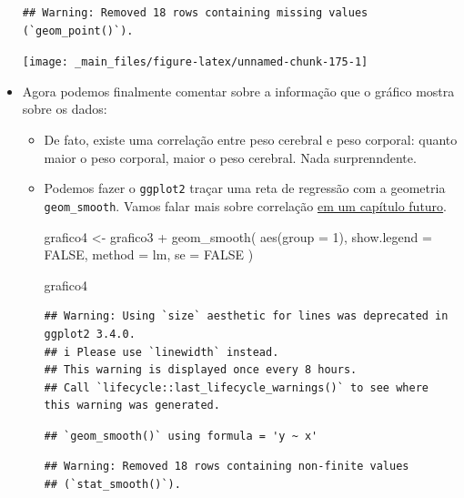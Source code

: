 \documentclass[
  11pt]{report}
\newenvironment{Shaded}{\begin{snugshade}}{\end{snugshade}}
\newcommand{\AttributeTok}[1]{\textcolor[rgb]{0.77,0.63,0.00}{#1}}
\newcommand{\ConstantTok}[1]{\textcolor[rgb]{0.00,0.00,0.00}{#1}}
\newcommand{\DecValTok}[1]{\textcolor[rgb]{0.00,0.00,0.81}{#1}}
\newcommand{\FunctionTok}[1]{\textcolor[rgb]{0.00,0.00,0.00}{#1}}
\newcommand{\NormalTok}[1]{#1}
\newcommand{\OtherTok}[1]{\textcolor[rgb]{0.56,0.35,0.01}{#1}}
\newcommand{\SpecialCharTok}[1]{\textcolor[rgb]{0.00,0.00,0.00}{#1}}
\newcommand{\StringTok}[1]{\textcolor[rgb]{0.31,0.60,0.02}{#1}}
\renewenvironment{Shaded}{
    \begin{mdframed}[%
      roundcorner=2pt,%
      innerleftmargin=5pt,%
      innerrightmargin=5pt,%
      topline=true,%
      leftline=true,%
      rightline=true,%
      bottomline=true,%
      linewidth=0.5pt,%
      linecolor=black!20,%
      backgroundcolor=black!2,%
      skipabove=2ex,%
      skipbelow=2.5ex%
    ]%
  }
  {
    \end{mdframed}
  }
\begin{document}
\begin{itemize}
\begin{verbatim}
## Warning: Removed 18 rows containing missing values (`geom_point()`).
\end{verbatim}

  \begin{center}\texttt{[image: \_main\_files/figure-latex/unnamed-chunk-175-1]} \end{center}
\item
  Agora podemos finalmente comentar sobre a informação que o gráfico mostra sobre os dados:

  \begin{itemize}
  \item
    De fato, existe uma correlação entre peso cerebral e peso corporal: quanto maior o peso corporal, maior o peso cerebral. Nada surprenndente.
  \item
    \protect\hypertarget{grafico4}{}{} Podemos fazer o \texttt{ggplot2} traçar uma reta de regressão com a geometria \texttt{geom\_smooth}. Vamos falar mais sobre correlação \protect\hyperlink{correlacao}{em um capítulo futuro}.

\begin{Shaded}
\begin{Highlighting}[]
\NormalTok{grafico4 }\OtherTok{\textless{}{-}}\NormalTok{ grafico3 }\SpecialCharTok{+}
  \FunctionTok{geom\_smooth}\NormalTok{(}
    \FunctionTok{aes}\NormalTok{(}\AttributeTok{group =} \DecValTok{1}\NormalTok{), }
    \AttributeTok{show.legend =} \ConstantTok{FALSE}\NormalTok{,}
    \AttributeTok{method =} \StringTok{\textquotesingle{}lm\textquotesingle{}}\NormalTok{, }
    \AttributeTok{se =} \ConstantTok{FALSE}
\NormalTok{  )}

\NormalTok{grafico4}
\end{Highlighting}
\end{Shaded}

\begin{verbatim}
## Warning: Using `size` aesthetic for lines was deprecated in ggplot2 3.4.0.
## i Please use `linewidth` instead.
## This warning is displayed once every 8 hours.
## Call `lifecycle::last_lifecycle_warnings()` to see where this warning was generated.
\end{verbatim}

\begin{verbatim}
## `geom_smooth()` using formula = 'y ~ x'
\end{verbatim}

\begin{verbatim}
## Warning: Removed 18 rows containing non-finite values
## (`stat_smooth()`).
\end{verbatim}


\end{itemize}
\end{itemize}
\end{document}
